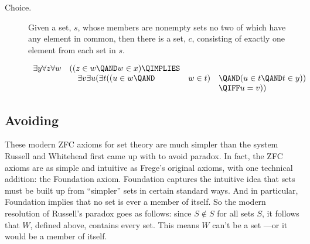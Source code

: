 \begin{description}
\iffalse  %
For every non-empty set, $x$, there is a set $y \in x$
  such that $x$ and $y$ have no elements in common.  
\fi

\item[Choice.]  Given a set, $s$, whose members are nonempty sets no two
  of which have any element in common, then there is a set, $c$,
  consisting of exactly one element from each set in $s$.

\iffalse

\begin{tabbing}
$\exists y \, \forall z \, \forall w \,
 \biggl( ($\=$z \in w \,\QAND\, w \in x) \; \QIMPLIES $\\
\> $\exists v \, \exists u \, \Bigl(\exists t \, \bigr((u \in w \, \QAND \, w \in t)$\=$\;\QAND\; (u \in t \,\QAND\, t \in y)\bigl) $\\
\> \> $\QIFF\; u = v\Bigr) \biggr)$
\end{tabbing}
\fi

\begin{editingnotes}

\[\begin{array}{rlll}
\exists y \forall z \forall w & ( (z \in w \QAND w \in x) \QIMPLIES\\
                              &\quad \exists v \exists u (\exists t
                                           ((u \in w \QAND & w \in t)
                                                              & \QAND (u \in t \QAND t \in y))\\
                                                            &&& \QIFF u = v))
\end{array}\]

\end{editingnotes}

\end{description}


\subsection{Avoiding }

These modern ZFC axioms for set theory are much simpler than the system
Russell and Whitehead first came up with to avoid paradox.  In fact, the
ZFC axioms are as simple and intuitive as Frege's original axioms, with
one technical addition: the Foundation axiom.  Foundation captures the
intuitive idea that sets must be built up from ``simpler'' sets in certain
standard ways.  And in particular, Foundation implies that no set is ever
a member of itself.  So the modern resolution of Russell's paradox goes as
follows: since $S \not \in S$ for all sets $S$, it follows that $W$,
defined above, contains every set.  This means $W$ can't be a set ---or it
would be a member of itself.

